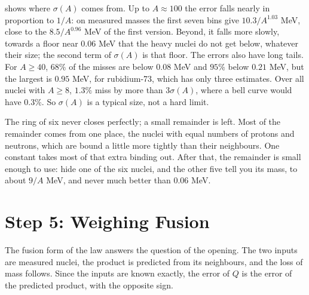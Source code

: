  shows where $\sigma(A)$ comes from. Up to $A \approx 100$ the error falls nearly in proportion to $1/A$: on measured masses the first seven bins give $10.3/A^{1.03}$ MeV, close to the $8.5/A^{0.96}$ MeV of the first version. Beyond, it falls more slowly, towards a floor near $0.06$ MeV that the heavy nuclei do not get below, whatever their size; the second term of $\sigma(A)$ is that floor. The errors also have long tails. For $A \ge 40$, $68\%$ of the misses are below $0.08$ MeV and $95\%$ below $0.21$ MeV, but the largest is $0.95$ MeV, for rubidium-73, which has only three estimates. Over all nuclei with $A \ge 8$, $1.3\%$ miss by more than $3\sigma(A)$, where a bell curve would have $0.3\%$. So $\sigma(A)$ is a typical size, not a hard limit.

\begin{plainwords}
The ring of six never closes perfectly; a small remainder is left. Most of the remainder comes from one place, the nuclei with equal numbers of protons and neutrons, which are bound a little more tightly than their neighbours. One constant takes most of that extra binding out. After that, the remainder is small enough to use: hide one of the six nuclei, and the other five tell you its mass, to about $9/A$ MeV, and never much better than $0.06$ MeV.
\end{plainwords}

\section{Step 5: Weighing Fusion}\label{sec:cl-weighing}

\enlargethispage{2\baselineskip}
The fusion form of the law answers the question of the opening. The two inputs are measured nuclei, the product is predicted from its neighbours, and the loss of mass follows. Since the inputs are known exactly, the error of $Q$ is the error of the predicted product, with the opposite sign.


